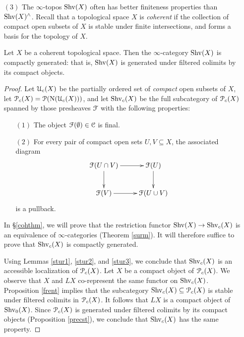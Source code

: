 \begin{itemize}
\item[$(3)$] The $\infty$-topos $\operatorname{Shv}(X)$ often has better finiteness properties
than $\operatorname{Shv}(X)^{\wedge}$. Recall that a topological space $X$ is {\it coherent}
if the collection of compact open subsets of $X$ is stable under finite intersections, and forms a basis for the topology of $X$.

\begin{proposition}\label{cohcomp}
Let $X$ be a coherent topological space. Then the $\infty$-category
$\operatorname{Shv}(X)$ is compactly generated: that is, $\operatorname{Shv}(X)$ is generated under filtered colimits
by its compact objects.
\end{proposition}

\begin{proof}
Let $\operatorname{\mathcal{U}}_c(X)$ be the partially ordered set of {\em compact} open subsets of $X$, let
$\operatorname{\mathcal{P}}_c(X) = \operatorname{\mathcal{P}}( \operatorname{N}(\operatorname{\mathcal{U}}_c(X)) )$, and let $\operatorname{Shv}_c(X)$ be the full subcategory of 
$\operatorname{\mathcal{P}}_c(X)$ spanned by those presheaves $\operatorname{\mathcal{F}}$ with the following properties:
\begin{itemize}
\item[$(1)$] The object $\operatorname{\mathcal{F}}(\emptyset) \in \operatorname{\mathcal{C}}$ is final.
\item[$(2)$] For every pair of compact open sets $U, V \subseteq X$, the associated diagram
$$ \xymatrix{ \calF( U \cap V) \ar[r] \ar[d] & \calF(U) \ar[d] \\
\calF(V) \ar[r] & \calF(U \cup V) }$$
is a pullback.
\end{itemize}

In \S \ref{cohthm}, we will prove that the restriction functor 
$\operatorname{Shv}(X) \rightarrow \operatorname{Shv}_c(X)$ is an equivalence of $\infty$-categories (Theorem \ref{surm}). 
It will therefore suffice to prove that $\operatorname{Shv}_c(X)$ is compactly generated. 

Using Lemmas \ref{stur1}, \ref{stur2}, and \ref{stur3}, we conclude that $\operatorname{Shv}_c(X)$ is an accessible localization of $\operatorname{\mathcal{P}}_c(X)$. 
Let $X$ be a compact object of $\operatorname{\mathcal{P}}_{c}(X)$. We observe that $X$ and $LX$ co-represent the same functor on $\operatorname{Shv}_{c}(X)$. Proposition \ref{frent} implies that the subcategory $\operatorname{Shv}_c(X) \subseteq \operatorname{\mathcal{P}}_c(X)$ is stable under filtered colimits in $\operatorname{\mathcal{P}}_c(X)$. It follows that
$LX$ is a compact object of $\operatorname{Shv}_0(X)$. Since $\operatorname{\mathcal{P}}_{c}(X)$ is generated under filtered colimits by its compact objects (Proposition \ref{precst}), we conclude that $\operatorname{Shv}_{c}(X)$ has the same property.
\end{proof}


\end{itemize}
